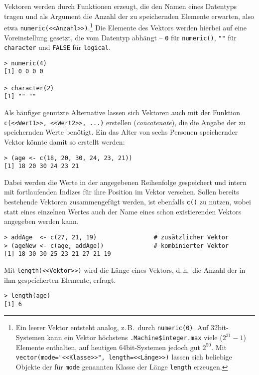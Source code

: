 Vektoren werden durch Funktionen erzeugt, die den Namen eines Datentyps tragen und als Argument die Anzahl der zu speichernden Elemente erwarten, also etwa \lstinline!numeric(<<Anzahl>>)!.\footnote{\label{ftn:vecDetails}Ein leerer Vektor entsteht analog, z.\,B.\ durch \lstinline!numeric(0)!. Auf 32bit-Systemen kann ein Vektor höchstens \lstinline!.Machine$integer.max! viele ($2^{31}-1$) Elemente enthalten, auf heutigen 64bit-Systemen jedoch gut $2^{50}$. Mit \lstinline!vector(mode="<<Klasse>>", length=<<Länge>>)! lassen sich beliebige Objekte der für \lstinline!mode! genannten Klasse der Länge \lstinline!length! erzeugen.} Die Elemente des Vektors werden hierbei auf eine Voreinstellung gesetzt, die vom Datentyp abhängt -- \lstinline!0! für \lstinline!numeric()!, \lstinline!""! für \lstinline!character! und \lstinline!FALSE! für \lstinline!logical!.
\begin{lstlisting}
> numeric(4)
[1] 0 0 0 0

> character(2)
[1] "" ""
\end{lstlisting}

Als häufiger genutzte Alternative lassen sich Vektoren auch mit der Funktion \lstinline!c(<<Wert1>>, <<Wert2>>, ...)! erstellen (\emph{concatenate}), die die Angabe der zu speichernden Werte benötigt. Ein das Alter von sechs Personen speichernder Vektor könnte damit so erstellt werden:
\begin{lstlisting}
> (age <- c(18, 20, 30, 24, 23, 21))
[1] 18 20 30 24 23 21
\end{lstlisting}

Dabei werden die Werte in der angegebenen Reihenfolge gespeichert und intern mit fortlaufenden Indizes für ihre Position im Vektor versehen. Sollen bereits bestehende Vektoren zusammengefügt werden, ist ebenfalls \lstinline!c()! zu nutzen, wobei statt eines einzelnen Wertes auch der Name eines schon existierenden Vektors angegeben werden kann.
\begin{lstlisting}
> addAge  <- c(27, 21, 19)                # zusätzlicher Vektor
> (ageNew <- c(age, addAge))              # kombinierter Vektor
[1] 18 30 30 25 23 21 27 21 19
\end{lstlisting}

Mit \lstinline!length(<<Vektor>>)! wird die Länge eines Vektors, d.\,h.\ die Anzahl der in ihm gespeicherten Elemente, erfragt.
\begin{lstlisting}
> length(age)
[1] 6
\end{lstlisting}


